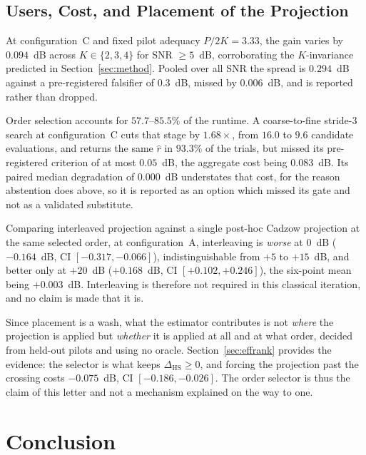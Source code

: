 \documentclass[journal]{IEEEtran}
\newcommand{\dhs}{\Delta_{\mathrm{HS}}}
\begin{document}
\subsection{Users, Cost, and Placement of the Projection}
\label{sec:kinv}

At configuration~C and fixed pilot adequacy $P/2K=3.33$, the gain varies by
$0.094$~dB across $K\in\{2,3,4\}$ for SNR $\ge5$~dB, corroborating the
$K$-invariance predicted in Section~\ref{sec:method}. Pooled over all SNR the
spread is $0.294$~dB against a pre-registered falsifier of $0.3$~dB, missed by
$0.006$~dB, and is reported rather than dropped.

Order selection accounts for $57.7$--$85.5\%$ of the runtime. A coarse-to-fine
stride-$3$ search at configuration~C cuts that stage by $1.68\times$, from $16.0$
to $9.6$ candidate evaluations, and returns the same $\hat r$ in $93.3\%$ of the
trials, but missed its pre-registered criterion of at most $0.05$~dB, the
aggregate cost being $0.083$~dB. Its paired median degradation of $0.000$~dB
understates that cost, for the reason abstention does above, so it is reported
as an option which missed its gate and not as a validated substitute.

Comparing interleaved projection against a single post-hoc Cadzow projection at
the same selected order, at configuration~A, interleaving is \emph{worse} at
$0$~dB ($-0.164$~dB, CI $[-0.317,-0.066]$), indistinguishable from $+5$ to
$+15$~dB, and better only at $+20$~dB ($+0.168$~dB, CI $[+0.102,+0.246]$), the
six-point mean being $+0.003$~dB. Interleaving is therefore not required in this
classical iteration, and no claim is made that it is.

Since placement is a wash, what the estimator contributes is not \emph{where}
the projection is applied but \emph{whether} it is applied at all and at what
order, decided from held-out pilots and using no oracle.
Section~\ref{sec:effrank} provides the evidence: the selector is what keeps
$\dhs\ge0$, and forcing the projection past the crossing costs $-0.075$~dB, CI
$[-0.186,-0.026]$. The order selector is thus the claim of this letter and not a
mechanism explained on the way to one.

\section{Conclusion}
\end{document}
